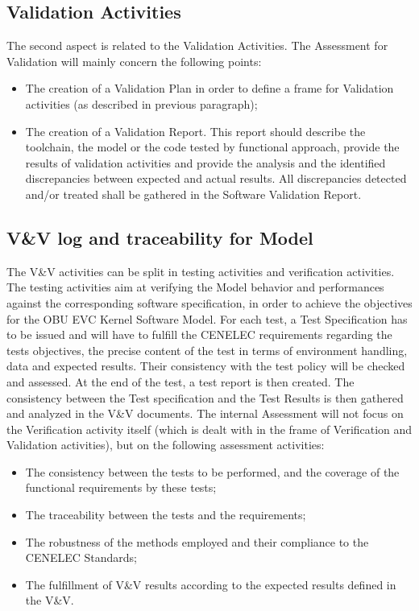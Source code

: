 \documentclass{template/openetcs_article}
\begin{document}
\subsection{Validation Activities}
The second aspect is related to the Validation Activities. The Assessment for Validation will mainly concern the following points:
\begin{itemize}
\item The creation of a Validation Plan in order to define a frame for Validation activities (as described in previous paragraph);
\item The creation of a Validation Report. This report should describe the toolchain, the model or the code tested by functional approach, provide the results of validation activities and provide the analysis and the identified discrepancies  between expected and actual results. All discrepancies detected and/or treated shall be gathered in the Software Validation Report.
\end{itemize}

\subsection{V\&V log and traceability for Model}
The V\&V activities can be split in testing activities and verification activities. The testing activities aim at verifying the Model behavior and performances against the corresponding software specification, in order to achieve the objectives for the OBU EVC Kernel Software Model. 
For each test, a Test Specification has to be issued and will have to fulfill the CENELEC requirements regarding the tests objectives, the precise content of the test in terms of environment handling, data and expected results. Their consistency with the test policy will be checked and assessed. At the end of the test, a test report is then created. The consistency between the Test specification and the Test Results is then gathered and analyzed in the V\&V documents.
The internal Assessment will not focus on the Verification activity itself (which is dealt with in the frame of Verification and Validation activities), but on the following assessment activities:
\begin{itemize}
\item The consistency between the tests to be performed, and the coverage of the functional requirements by these tests;
\item The traceability between the tests and the requirements;
\item The robustness of the  methods employed and their compliance to the CENELEC Standards;
\item The fulfillment of V\&V results according to the expected results defined in the V\&V.
\end{itemize}
\end{document}
